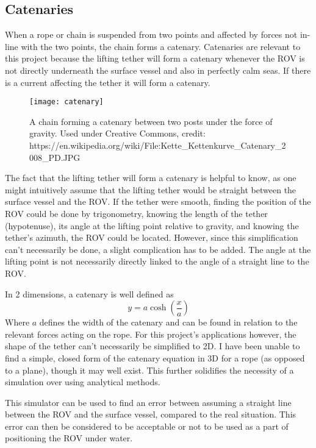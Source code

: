 \subsection{Catenaries}
\label{sec:catenary}
When a rope or chain is suspended from two points and affected by forces not in-line with the two points, the chain forms a catenary. Catenaries are relevant to this project because the lifting tether will form a catenary whenever the ROV is not directly underneath the surface vessel and also in perfectly calm seas. If there is a current affecting the tether it will form a catenary. 

\begin{figure}
	\centering
	\texttt{[image: catenary]}
	\caption{A chain forming a catenary between two posts under the force of gravity. Used under Creative Commons, credit: https://en.wikipedia.org/wiki/File:Kette\_Kettenkurve\_Catenary\_2008\_PD.JPG}
	\label{fig:catenary}
\end{figure}

The fact that the lifting tether will form a catenary is helpful to know, as one might intuitively assume that the lifting tether would be straight between the surface vessel and the ROV. If the tether were smooth, finding the position of the ROV could be done by trigonometry, knowing the length of the tether (hypotenuse), its angle at the lifting point relative to gravity, and knowing the tether's azimuth, the ROV could be located. However, since this simplification can't necessarily be done, a slight complication has to be added. The angle at the lifting point is not necessarily directly linked to the angle of a straight line to the ROV. 

In 2 dimensions, a catenary is well defined as 
\[y = a \cosh\left(\frac x a \right)\] 
Where \(a\) defines the width of the catenary and can be found in relation to the relevant forces acting on the rope. For this project's applications however, the shape of the tether can't necessarily be simplified to 2D. I have been unable to find a simple, closed form of the catenary equation in 3D for a rope (as opposed to a plane), though it may well exist. This further solidifies the necessity of a simulation over using analytical methods.

This simulator can be used to find an error between assuming a straight line between the ROV and the surface vessel, compared to the real situation. This error can then be considered to be acceptable or not to be used as a part of positioning the ROV under water.
